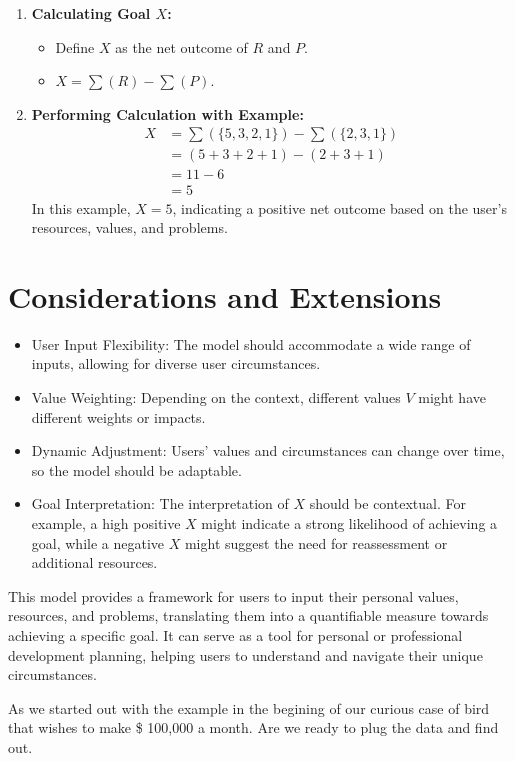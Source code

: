 \documentclass{article}
\begin{document}
\begin{enumerate}
  \item \textbf{Calculating Goal \( X \):}
  \begin{itemize}
    \item Define \( X \) as the net outcome of \( R \) and \( P \).
    \item \( X = \sum(R) - \sum(P) \).
  \end{itemize}

  \item \textbf{Performing Calculation with Example:}
  \begin{align*}
    X &= \sum(\{5, 3, 2, 1\}) - \sum(\{2, 3, 1\}) \\
      &= (5 + 3 + 2 + 1) - (2 + 3 + 1) \\
      &= 11 - 6 \\
      &= 5
  \end{align*}
  In this example, \( X = 5 \), indicating a positive net outcome based on the user’s resources, values, and problems.
\end{enumerate}

\section*{Considerations and Extensions}
\begin{itemize}
  \item User Input Flexibility: The model should accommodate a wide range of inputs, allowing for diverse user circumstances.
  \item Value Weighting: Depending on the context, different values \( V \) might have different weights or impacts.
  \item Dynamic Adjustment: Users’ values and circumstances can change over time, so the model should be adaptable.
  \item Goal Interpretation: The interpretation of \( X \) should be contextual. For example, a high positive \( X \) might indicate a strong likelihood of achieving a goal, while a negative \( X \) might suggest the need for reassessment or additional resources.
\end{itemize}

This model provides a framework for users to input their personal values, resources, and problems, translating them into a quantifiable measure towards achieving a specific goal. It can serve as a tool for personal or professional development planning, helping users to understand and navigate their unique circumstances. 

As we started out with the example in the begining of our curious case of bird that wishes to make \$ 100,000 a month. Are we ready to plug the data and find out.
\end{document}
